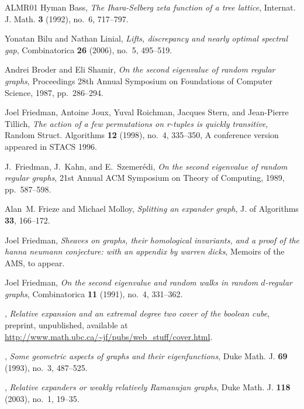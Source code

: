 \documentclass{memo-l}
\theoremstyle{plain}
\theoremstyle{definition}
\numberwithin{section}{chapter}
\numberwithin{equation}{chapter}
\theoremstyle{plain}
\theoremstyle{definition}
\begin{document}
\begin{thebibliography}{ALMR01}
Hyman Bass, \emph{The {I}hara-{S}elberg zeta function of a tree lattice},
  Internat. J. Math. \textbf{3} (1992), no.~6, 717--797. 

Yonatan Bilu and Nathan Linial, \emph{Lifts, discrepancy and nearly optimal
  spectral gap}, Combinatorica \textbf{26} (2006), no.~5, 495--519. 

Andrei Broder and Eli Shamir, \emph{On the second eigenvalue of random regular
  graphs}, Proceedings 28th Annual Symposium on Foundations of Computer
  Science, 1987, pp.~286--294.

Joel Friedman, Antoine Joux, Yuval Roichman, Jacques Stern, and Jean-Pierre
  Tillich, \emph{The action of a few permutations on r-tuples is quickly
  transitive}, Random Struct. Algorithms \textbf{12} (1998), no.~4, 335--350, A
  conference version appeared in {STACS} 1996.

J.~Friedman, J.~Kahn, and E.~Szemer{\'e}di, \emph{On the second eigenvalue of
  random regular graphs}, 21st Annual ACM Symposium on Theory of Computing,
  1989, pp.~587--598.

Alan~M. Frieze and Michael Molloy, \emph{Splitting an expander graph}, J. of
  Algorithms \textbf{33}, 166--172.

Joel Friedman, \emph{Sheaves on graphs, their homological invariants, and a
  proof of the hanna neumann conjecture: with an appendix by warren dicks},
  Memoirs of the AMS, to appear.

Joel Friedman, \emph{On the second eigenvalue and random walks in random
  $d$-regular graphs}, Combinatorica \textbf{11} (1991), no.~4, 331--362.

\bysame, \emph{Relative expansion and an extremal degree two cover of the
  boolean cube}, preprint, unpublished, available at
  \url{http://www.math.ubc.ca/~jf/pubs/web_stuff/cover.html}.

\bysame, \emph{Some geometric aspects of graphs and their eigenfunctions}, Duke
  Math. J. \textbf{69} (1993), no.~3, 487--525. 

\bysame, \emph{Relative expanders or weakly relatively {R}amanujan graphs},
  Duke Math. J. \textbf{118} (2003), no.~1, 19--35. 


\end{thebibliography}
\end{document}

